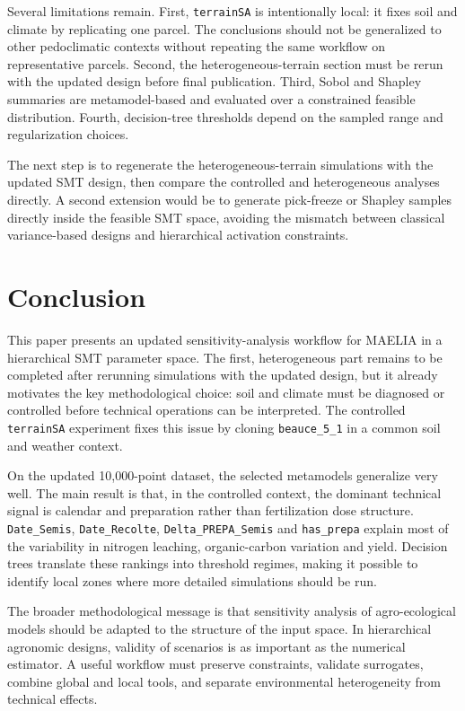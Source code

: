 \documentclass[11pt,a4paper]{article}
\newcommand{\param}[1]{\texttt{#1}}
\begin{document}
Several limitations remain. First, \texttt{terrainSA} is intentionally local: it fixes soil and climate by replicating one parcel. The conclusions should not be generalized to other pedoclimatic contexts without repeating the same workflow on representative parcels. Second, the heterogeneous-terrain section must be rerun with the updated design before final publication. Third, Sobol and Shapley summaries are metamodel-based and evaluated over a constrained feasible distribution. Fourth, decision-tree thresholds depend on the sampled range and regularization choices.

The next step is to regenerate the heterogeneous-terrain simulations with the updated SMT design, then compare the controlled and heterogeneous analyses directly. A second extension would be to generate pick-freeze or Shapley samples directly inside the feasible SMT space, avoiding the mismatch between classical variance-based designs and hierarchical activation constraints.

\section{Conclusion}

This paper presents an updated sensitivity-analysis workflow for MAELIA in a hierarchical SMT parameter space. The first, heterogeneous part remains to be completed after rerunning simulations with the updated design, but it already motivates the key methodological choice: soil and climate must be diagnosed or controlled before technical operations can be interpreted. The controlled \texttt{terrainSA} experiment fixes this issue by cloning \texttt{beauce\_5\_1} in a common soil and weather context.

On the updated 10,000-point dataset, the selected metamodels generalize very well. The main result is that, in the controlled context, the dominant technical signal is calendar and preparation rather than fertilization dose structure. \param{Date\_Semis}, \param{Date\_Recolte}, \param{Delta\_PREPA\_Semis} and \param{has\_prepa} explain most of the variability in nitrogen leaching, organic-carbon variation and yield. Decision trees translate these rankings into threshold regimes, making it possible to identify local zones where more detailed simulations should be run.

The broader methodological message is that sensitivity analysis of agro-ecological models should be adapted to the structure of the input space. In hierarchical agronomic designs, validity of scenarios is as important as the numerical estimator. A useful workflow must preserve constraints, validate surrogates, combine global and local tools, and separate environmental heterogeneity from technical effects.
\end{document}
